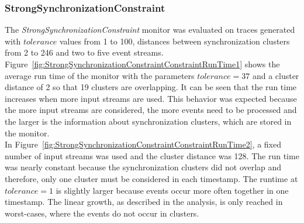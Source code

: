 \subsubsection{StrongSynchronizationConstraint}
	The \textit{StrongSynchronizationConstraint} monitor was evaluated on traces generated with $tolerance$ values from 1 to 100, distances between synchronization clusters from 2 to 246 and two to five event streams.\\
	Figure~\ref{fig:StrongSynchronizationConstraintConstraintRunTime1} shows the average run time of the monitor with the parameters $tolerance = 37$ and a cluster distance of 2 so that 19 clusters are overlapping. It can be seen that the run time increases when more input streams are used. This behavior was expected because the more input streams are considered, the more events need to be processed and the larger is the information about synchronization clusters, which are stored in the monitor.\\
	In Figure~\ref{fig:StrongSynchronizationConstraintConstraintRunTime2}, a fixed number of input streams was used and the cluster distance was 128. The run time was nearly constant because the synchronization clusters did not overlap and therefore, only one cluster must be considered in each timestamp. The runtime at $tolerance=1$ is slightly larger because events occur more often together in one timestamp. The linear growth, as described in the analysis, is only reached in worst-cases, where the events do not occur in clusters.

